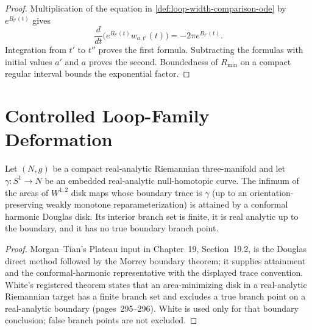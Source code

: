 \begin{proof}
Multiplication of the equation in \ref{def:loop-width-comparison-ode} by
$e^{B_{t'}(t)}$ gives
\[
 \frac d{dt}\bigl(e^{B_{t'}(t)}w_{a,t'}(t)\bigr)
 =-2\pi e^{B_{t'}(t)}.
\]
Integration from $t'$ to $t''$ proves the first formula.  Subtracting the
formulas with initial values $a'$ and $a$ proves the second.  Boundedness of
$R_{\min}$ on a compact regular interval bounds the exponential factor.
\end{proof}
\section{Controlled Loop-Family Deformation}

\begin{theorem}
\label{thm:plateau-disk-existence-regularity}
\notready
Let $(N,g)$ be a compact real-analytic Riemannian three-manifold and let
$\gamma\colon S^1\to N$ be an embedded real-analytic null-homotopic curve.
The infimum of the areas of $W^{1,2}$ disk maps whose boundary trace is
$\gamma$ (up to an orientation-preserving weakly monotone
reparameterization) is attained by a conformal harmonic Douglas disk.  Its
interior branch set is finite, it is real analytic up to the boundary, and it
has no true boundary branch point.
\end{theorem}
\begin{proof}
Morgan--Tian's Plateau input in Chapter~19, Section~19.2, is the Douglas
direct method followed by the Morrey boundary theorem; it supplies attainment
and the conformal-harmonic representative with the displayed trace
convention.  White's registered theorem states that an area-minimizing disk
in a real-analytic Riemannian target has a finite branch set and excludes a
true branch point on a real-analytic boundary (pages~295--296).  White is used
only for that boundary conclusion; false branch points are not excluded.
\end{proof}

